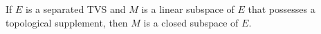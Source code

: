 If $E$ is a separated TVS and $M$ is a linear subspace of $E$ that possesses a topological supplement, then $M$ is a closed subspace of $E$.
